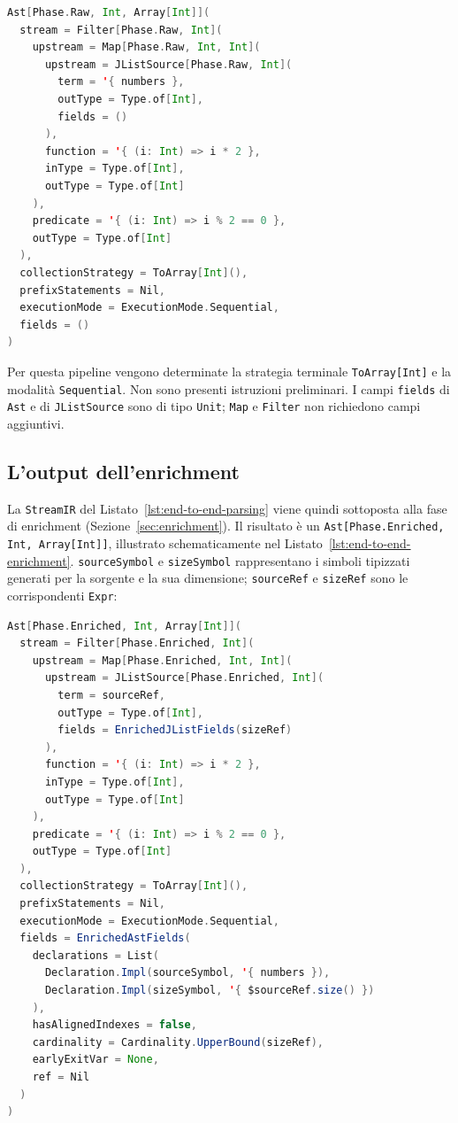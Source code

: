 \documentclass[a4paper,11pt]{report}
\theoremstyle{definition}
\begin{document}
\begin{lstlisting}[language=Scala,caption={Ast in fase Raw ottenuto al termine del parsing},label={lst:end-to-end-parsing}]
Ast[Phase.Raw, Int, Array[Int]](
  stream = Filter[Phase.Raw, Int](
    upstream = Map[Phase.Raw, Int, Int](
      upstream = JListSource[Phase.Raw, Int](
        term = '{ numbers },
        outType = Type.of[Int],
        fields = ()
      ),
      function = '{ (i: Int) => i * 2 },
      inType = Type.of[Int],
      outType = Type.of[Int]
    ),
    predicate = '{ (i: Int) => i % 2 == 0 },
    outType = Type.of[Int]
  ),
  collectionStrategy = ToArray[Int](),
  prefixStatements = Nil,
  executionMode = ExecutionMode.Sequential,
  fields = ()
)
\end{lstlisting}

Per questa pipeline vengono determinate la strategia terminale \texttt{ToArray[Int]} e la modalità \texttt{Sequential}. Non sono presenti istruzioni preliminari. I campi \texttt{fields} di \texttt{Ast} e di \texttt{JListSource} sono di tipo \texttt{Unit}; \texttt{Map} e \texttt{Filter} non richiedono campi aggiuntivi.
\subsection{L'output dell'enrichment}

La \texttt{StreamIR} del Listato~\ref{lst:end-to-end-parsing} viene quindi sottoposta alla fase di enrichment (Sezione~\ref{sec:enrichment}). Il risultato è un \texttt{Ast[Phase.Enriched, Int, Array[Int]]}, illustrato schematicamente nel Listato~\ref{lst:end-to-end-enrichment}. \texttt{sourceSymbol} e \texttt{sizeSymbol} rappresentano i simboli tipizzati generati per la sorgente e la sua dimensione; \texttt{sourceRef} e \texttt{sizeRef} sono le corrispondenti \texttt{Expr}:

\begin{lstlisting}[language=Scala,caption={Ast in fase Enriched dopo l'enrichment},label={lst:end-to-end-enrichment}]
Ast[Phase.Enriched, Int, Array[Int]](
  stream = Filter[Phase.Enriched, Int](
    upstream = Map[Phase.Enriched, Int, Int](
      upstream = JListSource[Phase.Enriched, Int](
        term = sourceRef,
        outType = Type.of[Int],
        fields = EnrichedJListFields(sizeRef)
      ),
      function = '{ (i: Int) => i * 2 },
      inType = Type.of[Int],
      outType = Type.of[Int]
    ),
    predicate = '{ (i: Int) => i % 2 == 0 },
    outType = Type.of[Int]
  ),
  collectionStrategy = ToArray[Int](),
  prefixStatements = Nil,
  executionMode = ExecutionMode.Sequential,
  fields = EnrichedAstFields(
    declarations = List(
      Declaration.Impl(sourceSymbol, '{ numbers }),
      Declaration.Impl(sizeSymbol, '{ $sourceRef.size() })
    ),
    hasAlignedIndexes = false,
    cardinality = Cardinality.UpperBound(sizeRef),
    earlyExitVar = None,
    ref = Nil
  )
)
\end{lstlisting}
\end{document}
